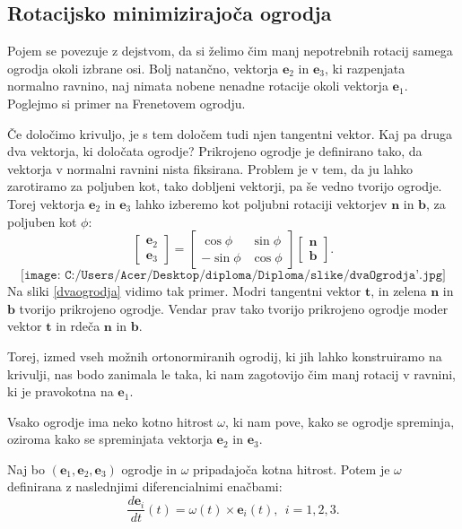 \documentclass[mat1]{fmfdelo}
\newcommand{\e}{\boldsymbol e}
\newcommand{\TT}{\boldsymbol t}
\newcommand{\NN}{\boldsymbol n}
\newcommand{\BB}{\boldsymbol b}
\begin{document}
\subsection{Rotacijsko minimizirajoča ogrodja} Pojem se povezuje z dejstvom, da si želimo čim manj nepotrebnih rotacij samega ogrodja okoli izbrane osi. Bolj natančno, vektorja $\e_2$ in $\e_3$, ki razpenjata normalno ravnino, naj nimata nobene nenadne rotacije okoli vektorja $\e_1$. Poglejmo si primer na Frenetovem ogrodju.
\begin{primer}
	Če določimo krivuljo, je s tem določem tudi njen tangentni vektor. Kaj pa druga dva vektorja, ki določata ogrodje? Prikrojeno ogrodje je definirano tako, da vektorja v normalni ravnini nista fiksirana. Problem je v tem, da ju lahko zarotiramo za poljuben kot, tako dobljeni vektorji, pa še vedno tvorijo ogrodje. Torej vektorja $\e_2$ in $\e_3$ lahko izberemo kot poljubni rotaciji vektorjev $\NN$ in $\BB$, za poljuben kot $\phi$:
	\begin{equation*}
		\begin{bmatrix}
		\e_2 \\
		\e_3
		\end{bmatrix}
		=
		\begin{bmatrix}
		\cos \phi & \sin \phi \\
		-\sin \phi & \cos \phi
		\end{bmatrix}
		\begin{bmatrix}
		\NN \\ \BB
		\end{bmatrix}.
	\end{equation*}
\begin{equation*}
\texttt{[image: C:/Users/Acer/Desktop/diploma/Diploma/slike/dvaOgrodja'.jpg]}
\end{equation*}
Na sliki \ref{dvaogrodja} vidimo tak primer. Modri tangentni vektor $\TT$, in zelena $\NN$ in $\BB$ tvorijo prikrojeno ogrodje. Vendar prav tako tvorijo prikrojeno ogrodje moder vektor $\TT$ in rdeča $\NN$ in $\BB$.
\end{primer}
Torej, izmed vseh možnih ortonormiranih ogrodij, ki jih lahko konstruiramo na krivulji, nas bodo zanimala le taka, ki nam zagotovijo čim manj rotacij v ravnini, ki je pravokotna  na $\e_1$.
 
Vsako ogrodje ima neko kotno hitrost $\omega$, ki nam pove, kako se ogrodje spreminja, oziroma kako se spreminjata vektorja $\e_2$ in $\e_3$.
\begin{definicija}
Naj bo $(\e_1,\e_2,\e_3)$ ogrodje in $\omega$ pripadajoča kotna hitrost. Potem je $\omega$ definirana z naslednjimi diferencialnimi enačbami:
\begin{equation}
\frac{d\e_i}{dt}(t) = \omega(t) \times \e_i(t), ~~ i=1,2,3.
\end{equation}
\end{definicija}
\end{document}
